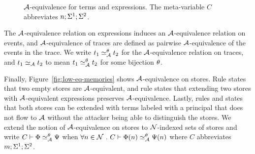 \begin{figure}
    \centering
    \caption{$\mathcal{A}$-equivalence for terms and expressions. The meta-variable $C$ abbreviates $n; \Sigma^1; \Sigma^2$.}
    \label{fig:low-eq-expr}
\end{figure}

The $\mathcal{A}$-equivalence relation on expressions induces an $\mathcal{A}$-equivalence relation on events, and $\mathcal{A}$-equivalence of traces are defined as pairwise $\mathcal{A}$-equivalence of the events in the trace. We write $t_1 \simeq_{\mathcal{A}}^{\theta} t_2$ for the $\mathcal{A}$-equivalence relation on traces, and $t_1 \simeq_{\mathcal{A}} t_2$ to mean $t_1 \simeq_{\mathcal{A}}^{\theta} t_2$ for some bijection $\theta$.

Finally, Figure~\ref{fig:low-eq-memories} shows $\mathcal{A}$-equivalence on stores. Rule  states that two empty stores are $\mathcal{A}$-equivalent, and rule  states that extending two stores with $\mathcal{A}$-equivalent expressions preserves $\mathcal{A}$-equivalence. Lastly, rules  and  states that both stores can be extended with terms labeled with a principal that does not flow to $\mathcal{A}$ without the attacker being able to distinguish the stores. We extend the notion of $\mathcal{A}$-equivalence on stores to $\mathcal{N}$-indexed sets of stores and write $\loweq{C}{\Attacker}[\bijection]{\globalstore}{\altglobalstore}$ when $\forall n \in \Nameset~.~ \loweq{C}{\Attacker}[\bijection]{\globalstore(n)}{\altglobalstore(n)}$ where $C$ abbreviates $m; \Sigma^1; \Sigma^2$.

